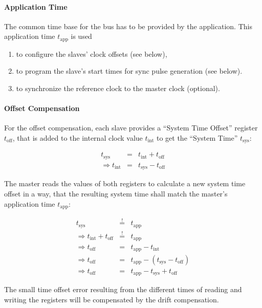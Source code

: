 \documentclass[a4paper,12pt,BCOR=6mm,bibtotoc,idxtotoc]{scrbook}
\begin{document}
\paragraph{Application Time} The common time base for the bus has to be
provided by the application. This application time $t_\text{app}$ is used

\begin{enumerate}
\item to configure the slaves' clock offsets (see below),
\item to program the slave's start times for sync pulse generation (see
below).
\item to synchronize the reference clock to the master clock (optional).
\end{enumerate}

\paragraph{Offset Compensation} For the offset compensation, each slave
provides a ``System Time Offset'' register $t_\text{off}$, that is added to
the internal clock value $t_\text{int}$ to get the ``System Time''
$t_\text{sys}$:

\begin{eqnarray}
t_\text{sys} & = & t_\text{int} + t_\text{off} \\
\Rightarrow t_\text{int} & = & t_\text{sys} - t_\text{off} \nonumber
\end{eqnarray}

The master reads the values of both registers to calculate a new system time
offset in a way, that the resulting system time shall match the master's
application time $t_\text{app}$:

\begin{eqnarray}
t_\text{sys} & \stackrel{!}{=} & t_\text{app} \\
\Rightarrow t_\text{int} + t_\text{off} & \stackrel{!}{=} & t_\text{app} \nonumber \\
\Rightarrow t_\text{off} & = & t_\text{app} - t_\text{int} \nonumber \\
\Rightarrow t_\text{off} & = & t_\text{app} - (t_\text{sys} - t_\text{off}) \nonumber \\
\Rightarrow t_\text{off} & = & t_\text{app} - t_\text{sys} + t_\text{off}
\end{eqnarray}

The small time offset error resulting from the different times of reading and
writing the registers will be compensated by the drift compensation.
\end{document}
